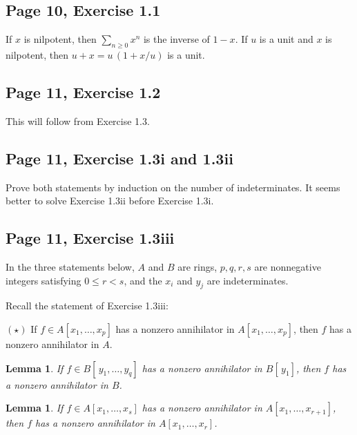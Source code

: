 \documentclass[parskip=half,fontsize=12pt]{scrartcl}%
\newtheorem{lem}[thm]{Lemma}
\begin{document}
\subsection{Page 10, Exercise 1.1}%

If $x$ is nilpotent, then $\sum_{n\ge0}x^n$ is the inverse of $1-x$. If $u$ is a unit and $x$ is nilpotent, then $u+x=u\,(1+x/u)$ is a unit.

\subsection{Page 11, Exercise 1.2}%

This will follow from Exercise 1.3.



\subsection{Page 11, Exercise 1.3i and 1.3ii}%

Prove both statements by induction on the number of indeterminates. It seems better to solve Exercise 1.3ii before Exercise 1.3i.

\subsection{Page 11, Exercise 1.3iii}%

In the three statements below, $A$ and $B$ are rings, $p,q,r,s$ are nonnegative integers satisfying $0\le r<s$, and the $x_i$ and $y_j$ are indeterminates.

Recall the statement of Exercise 1.3iii: 

$(\star)$ If $f\in A[x_1,\dots,x_p]$ has a nonzero annihilator in $A[x_1,\dots,x_p]$, then $f$ has a nonzero annihilator in $A$. 

\begin{lem}\label{1.3iiil1}
If $f\in B[\,y_1,\dots,y_q]$ has a nonzero annihilator in $B[\,y_1]$, then $f$ has a nonzero annihilator in $B$.
\end{lem}

\begin{lem}\label{1.3iiil2}
If $f\in A[x_1,\dots,x_s]$ has a nonzero annihilator in $A[x_1,\dots,x_{r+1}]$, then $f$ has a nonzero annihilator in $A[x_1,\dots,x_r]$.
\end{lem}
\end{document}
